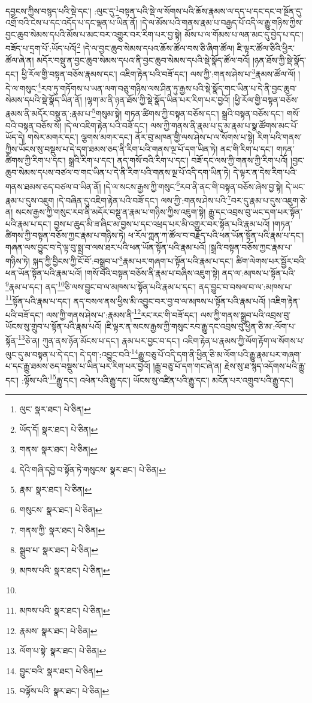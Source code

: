 དབྱངས་ཀྱིས་བསྙད་པའི་སྡེ་དང་། :ལུང་དུ་\footnote{ལུང་  སྣར་ཐང་།  པེ་ཅིན། }བསྟན་པའི་སྡེ་ལ་སོགས་པའི་ཆོས་རྣམས་ལ་དད་པ་དང་དང་བ་སྔོན་དུ་འགྲོ་བའི་ངེས་པ་དང་འདོད་པ་དང་ལྡན་པ་ཡིན་ནོ། །དེ་ལ་མོས་པའི་གནས་རྣམ་པ་བརྒྱད་པོ་འདི་ལ་རྒྱུ་གཉིས་ཀྱིས་བྱང་ཆུབ་སེམས་དཔའི་མོས་པ་མང་བར་འགྱུར་བར་རིག་པར་བྱ་སྟེ། མོས་པ་ལ་གོམས་པ་ལན་མང་དུ་བྱེད་པ་དང་། བཟོད་པ་དྲག་པོ་:ཡོད་པའོ།\footnote{ཡོད་དོ།  སྣར་ཐང་།  པེ་ཅིན། } །དེ་ལ་བྱང་ཆུབ་སེམས་དཔའ་ཆོས་ཚོལ་བས་ཅི་ཞིག་ཚོལ། ཇི་ལྟར་ཚོལ་ཅིའི་ཕྱིར་ཚོལ་ཞེ་ན། མདོར་བསྡུ་ན་བྱང་ཆུབ་སེམས་དཔའ་ནི་བྱང་ཆུབ་སེམས་དཔའི་སྡེ་སྣོད་ཚོལ་བའོ། །ཉན་ཐོས་ཀྱི་སྡེ་སྣོད་དང་། ཕྱི་རོལ་གྱི་བསྟན་བཅོས་རྣམས་དང་། འཇིག་རྟེན་པའི་བཟོ་དང་། ལས་ཀྱི་:གནས་ཤེས་པ་\footnote{གནས་  སྣར་ཐང་།  པེ་ཅིན། }རྣམས་ཚོལ་ལོ། །
དེ་ལ་གསུང་\footnote{དེའི་གཞི་དབྱེ་བ་སྟོན་ཏེ་གསུངས་  སྣར་ཐང་།  པེ་ཅིན། }རབ་ཏུ་གཏོགས་པ་ཡན་ལག་བཅུ་གཉིས་ལས་ཤིན་ཏུ་རྒྱས་པའི་སྡེ་སྣོད་གང་ཡིན་པ་དེ་ནི་བྱང་ཆུབ་སེམས་དཔའི་སྡེ་སྣོད་ཡིན་ནོ། །ལྷག་མ་ནི་ཉན་ཐོས་ཀྱི་སྡེ་སྣོད་ཡིན་པར་རིག་པར་བྱའོ། །ཕྱི་རོལ་གྱི་བསྟན་བཅོས་རྣམས་ནི་མདོར་བསྡུ་ན་:རྣམ་པ་\footnote{རྣམ་  སྣར་ཐང་།  པེ་ཅིན། }གསུམ་སྟེ། གཏན་ཚིགས་ཀྱི་བསྟན་བཅོས་དང་། སྒྲའི་བསྟན་བཅོས་དང་། གསོ་བའི་བསྟན་བཅོས་སོ། །དེ་ལ་འཇིག་རྟེན་པའི་བཟོ་དང་། ལས་ཀྱི་གནས་ནི་རྣམ་པ་དུ་མ་རྣམ་པ་སྣ་ཚོགས་མང་པོ་ཡོད་དེ། གསེར་མགར་དང་། ལྕགས་མགར་དང་། ནོར་བུ་མཁན་གྱི་ལས་ཤེས་པ་ལ་སོགས་པ་སྟེ། རིག་པའི་གནས་ཀྱིས་ཡོངས་སུ་བསྡུས་པ་དེ་དག་ཐམས་ཅད་ནི་རིག་པའི་གནས་ལྔ་པོ་དག་ཡིན་ཏེ། ནང་གི་རིག་པ་དང་། གཏན་ཚིགས་ཀྱི་རིག་པ་དང་། སྒྲའི་རིག་པ་དང་། ནད་གསོ་བའི་རིག་པ་དང་། བཟོ་དང་ལས་ཀྱི་གནས་ཀྱི་རིག་པའོ། །བྱང་ཆུབ་སེམས་དཔས་བཙལ་བ་གང་ཡིན་པ་དེ་ནི་རིག་པའི་གནས་ལྔ་པོ་འདི་དག་ཡིན་ཏེ། དེ་ལྟར་ན་དེས་རིག་པའི་གནས་ཐམས་ཅད་བཙལ་བ་ཡིན་ནོ། །དེ་ལ་སངས་རྒྱས་ཀྱི་གསུང་\footnote{གསུངས་  སྣར་ཐང་།  པེ་ཅིན། }རབ་ནི་ནང་གི་བསྟན་བཅོས་ཞེས་བྱ་སྟེ། དེ་ཡང་རྣམ་པ་དུས་འཇུག །དེ་བཞིན་དུ་འཇིག་རྟེན་པའི་བཟོ་དང་། ལས་ཀྱི་:གནས་ཤེས་པའི་\footnote{གནས་ཀྱི་  སྣར་ཐང་།  པེ་ཅིན། }བར་དུ་རྣམ་པ་དུས་འཇུག་ཅེ་ན། སངས་རྒྱས་ཀྱི་གསུང་རབ་ནི་མདོར་བསྡུ་ན་རྣམ་པ་གཉིས་ཀྱིས་འཇུག་སྟེ། རྒྱུ་དང་འབྲས་བུ་ཡང་དག་པར་སྟོན་པའི་རྣམ་པ་དང་། བྱས་པ་ཆུད་མི་ཟ་ཞིང་མ་བྱས་པ་དང་འཕྲད་པར་མི་འགྱུར་བར་སྟོན་པའི་རྣམ་པའོ། །གཏན་ཚིགས་ཀྱི་བསྟན་བཅོས་ཀྱང་རྣམ་པ་གཉིས་ཏེ། ཕ་རོལ་ཀླན་ཀ་ཚོལ་བ་བརྗོད་པའི་ཕན་ཡོན་སྟོན་པའི་རྣམ་པ་དང་། གཞན་ལས་བྱུང་བ་དེ་ལྟ་བུ་སྨྲ་བ་ལས་ཐར་པའི་ཕན་ཡོན་སྟོན་པའི་རྣམ་པའོ། །སྒྲའི་བསྟན་བཅོས་ཀྱང་རྣམ་པ་གཉིས་ཏེ། སྐད་ཀྱི་བྱིངས་ཀྱི་ངོ་བོ་:བསྒྲུབ་པ་\footnote{སྒྲུབ་པ་  སྣར་ཐང་།  པེ་ཅིན། }རྣམ་པར་གཞག་པ་སྟོན་པའི་རྣམ་པ་དང་། ཚིག་ལེགས་པར་སྦྱོར་བའི་ཕན་ཡོན་སྟོན་པའི་རྣམ་པའོ། །གསོ་བའི་བསྟན་བཅོས་ནི་རྣམ་པ་བཞིས་འཇུག་སྟེ། ནད་ལ་:མཁས་པ་སྟོན་པའི་\footnote{མཁས་པའི་  སྣར་ཐང་།  པེ་ཅིན། }རྣམ་པ་དང་། ནད་\footnote{}ཅི་ལས་བྱུང་བ་ལ་མཁས་པ་སྟོན་པའི་རྣམ་པ་དང་། ནད་བྱུང་བ་བསལ་བ་ལ་:མཁས་པ་\footnote{མཁས་པའི་  སྣར་ཐང་།  པེ་ཅིན། }སྟོན་པའི་རྣམ་པ་དང་། ནད་བསལ་ནས་ཕྱིས་མི་འབྱུང་བར་བྱ་བ་ལ་མཁས་པ་སྟོན་པའི་རྣམ་པའོ། །འཇིག་རྟེན་པའི་བཟོ་དང་། ལས་ཀྱི་གནས་ཤེས་པ་:རྣམས་ནི་\footnote{རྣམས་  སྣར་ཐང་།  པེ་ཅིན། }རང་རང་གི་བཟོ་དང་། ལས་ཀྱི་གནས་སྒྲུབ་པའི་འབྲས་བུ་ཡོངས་སུ་གྲུབ་པ་སྟོན་པའི་རྣམ་པའོ། །ཇི་ལྟར་ན་སངས་རྒྱས་ཀྱི་གསུང་རབ་རྒྱུ་དང་འབྲས་བུ་ཕྱིན་ཅི་མ་:ལོག་པ་སྟོན་\footnote{ལོག་པ་སྟེ་  སྣར་ཐང་།  པེ་ཅིན། }ཅེ་ན། ཀུན་ནས་ཉོན་མོངས་པ་དང་། རྣམ་པར་བྱང་བ་དང་། འཇིག་རྟེན་པ་རྣམས་ཀྱི་ལོག་རྟོག་ལ་སོགས་པ་ལུང་དུ་མ་བསྟན་པ་དེ་དང་། དེ་དག་:འབྱུང་བའི་\footnote{བྱུང་བའི་  སྣར་ཐང་།  པེ་ཅིན། }རྒྱུ་བཅུ་པོ་འདི་དག་ནི་ཕྱིན་ཅི་མ་ལོག་པའི་རྒྱུ་རྣམ་པར་གཞག་པ་དང་རྒྱུ་ཐམས་ཅད་བསྡུས་པ་ཡིན་པར་རིག་པར་བྱའོ། །རྒྱུ་བཅུ་པོ་དག་གང་ཞེ་ན། རྗེས་སུ་ཐ་སྙད་འདོགས་པའི་རྒྱུ་དང་། :ལྟོས་པའི་\footnote{བལྟོས་པའི་  སྣར་ཐང་།  པེ་ཅིན། }རྒྱུ་དང་། འཕེན་པའི་རྒྱུ་དང་། ཡོངས་སུ་འཛིན་པའི་རྒྱུ་དང་། མངོན་པར་འགྲུབ་པའི་རྒྱུ་དང་། 